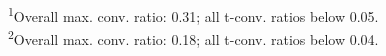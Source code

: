 \vspace{-5mm}
\begin{minipage}{\linewidth}
\textsuperscript{1}Overall max. conv. ratio: 0.31; all t-conv. ratios below 0.05. \\ 
\textsuperscript{2}Overall max. conv. ratio: 0.18; all t-conv. ratios below 0.04. \\ 
\end{minipage}
